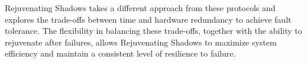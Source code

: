 


Rejuvenating Shadows takes a different approach from these protocols and explores the trade-offs between time and hardware redundancy to achieve fault tolerance. The flexibility in balancing these trade-offs, together with the ability to rejuvenate after failures, allows Rejuvenating Shadows to maximize system efficiency and maintain a consistent level of resilience to failure.
